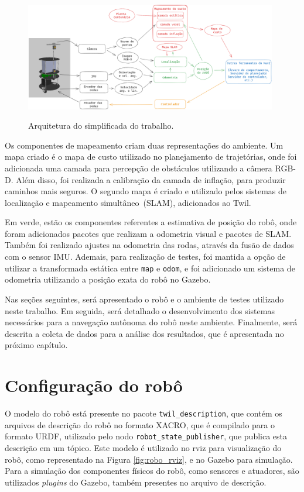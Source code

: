 \documentclass[repeatfields,xlists,xpacks,oneside,yearsonly]{ufrgscca}
\begin{document}
\begin{figure}[h]
    {
        \centering
        \caption{Arquitetura do simplificada do trabalho.}
        \label{fig:arq_trabalho}
        \includegraphics[width=0.98\textwidth]{arquitetura_simplificadav3.png}\\
    }
\end{figure}

Os componentes de mapeamento criam duas representações do ambiente.
Um mapa criado é o mapa de custo utilizado no planejamento de
trajetórias, onde foi adicionada uma camada para percepção de
obstáculos utilizando a câmera RGB-D. Além disso, foi realizada a
calibração da camada de inflação, para produzir caminhos mais
seguros. O segundo mapa é criado e utilizado pelos sistemas de
localização e mapeamento simultâneo~(SLAM), adicionados ao Twil.

Em verde, estão os componentes referentes a estimativa de posição do
robô, onde foram adicionados pacotes que realizam a odometria visual
e pacotes de SLAM. Também foi realizado ajustes na odometria das
rodas, através da fusão de dados com o sensor IMU. Ademais, para
realização de testes, foi mantida a opção de utilizar a transformada
estática entre \texttt{map} e \texttt{odom}, e foi adicionado um
sistema de odometria utilizando a posição exata do robô no Gazebo.

Nas seções seguintes, será apresentado o robô e o ambiente de testes
utilizado neste trabalho. Em seguida, será detalhado o
desenvolvimento dos sistemas necessários para a navegação autônoma do
robô neste ambiente. Finalmente, será descrita a coleta de dados para
a análise dos resultados, que é apresentada no próximo capítulo.

\section{Configuração do robô}

O modelo do robô está presente no pacote \texttt{twil\_description},
que contém os arquivos de descrição do robô no formato XACRO, que é
compilado para o formato URDF, utilizado pelo nodo
\texttt{robot\_state\_publisher}, que publica esta descrição em um
tópico. Este modelo é utilizado no rviz para visualização do robô,
como representado na Figura \ref{fig:robo_rviz}, e no Gazebo para
simulação. Para a simulação dos componentes físicos do robô, como
sensores e atuadores, são utilizados \textit{plugins} do Gazebo,
também presentes no arquivo de descrição.
\end{document}
